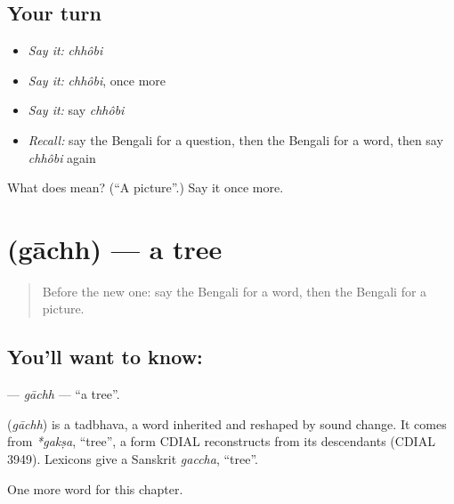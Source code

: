 \subsection*{Your turn}
\begin{itemize}
\raggedright
  \item \emph{Say it:} \emph{chhôbi}
  \item \emph{Say it:} \emph{chhôbi}, once more
  \item \emph{Say it:} say \emph{chhôbi}
  \item \emph{Recall:} say the Bengali for a question, then the Bengali for a word, then say \emph{chhôbi} again
\end{itemize}

\begin{tcolorbox}[breakable,colback=teal!4,colframe=teal!35!black,title={Before you move on}]
What does  mean? (\textquotedblleft{}A picture\textquotedblright{}.) Say it once more.
\end{tcolorbox}
\section[\texorpdfstring{\bn{গাছ} (gāchh)}{গাছ (gāchh)}]{ (gāchh) — a tree}

\label{lesson:BN-C65-gachh}



\begin{quote}
Before the new one: say the Bengali for a word, then the Bengali for a picture.
\end{quote}

\subsection*{You'll want to know: }
\textbf{} — \emph{gāchh} — \textquotedblleft{}a tree\textquotedblright{}.

\begin{cousinweb}
\textbf{} (\emph{gāchh}) is a tadbhava, a word inherited and reshaped by sound change. It comes from \emph{*gakṣa}, \textquotedblleft{}tree\textquotedblright{}, a form CDIAL reconstructs from its descendants (CDIAL 3949). Lexicons give a Sanskrit \emph{gaccha}, \textquotedblleft{}tree\textquotedblright{}.
\end{cousinweb}

\begin{grammarlens}[title={What you've built}]
One more word for this chapter.
\end{grammarlens}


